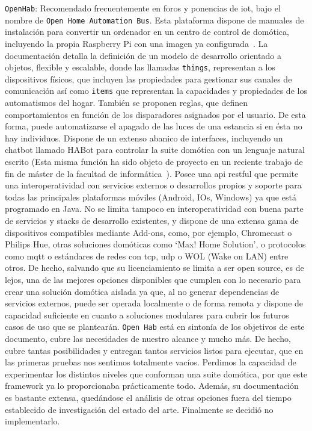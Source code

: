 \vspace{1cm}

\verb|OpenHab|: Recomendado frecuentemente en foros y ponencias de \gls{iot}, bajo el nombre de \verb|Open Home Automation Bus|. Esta plataforma dispone de manuales de instalación para convertir un ordenador en un centro de control de domótica, incluyendo la propia Raspberry Pi con una imagen ya configurada~\cite{openHabRaspberryPi}. La documentación detalla la definición de un modelo de desarrollo orientado a objetos, flexible y escalable, donde las llamadas \verb|things|, representan a los dispositivos físicos, que incluyen las propiedades para gestionar sus canales de comunicación así como \verb|items| que representan la capacidades y propiedades de los automatismos del hogar. También se proponen reglas, que definen comportamientos en función de los disparadores asignados por el usuario. De esta forma, puede automatizarse el apagado de las luces de una estancia si en ésta no hay individuos. Dispone de un extenso abanico de interfaces, incluyendo un chatbot llamado HABot para controlar la suite domótica con un lenguaje natural escrito (Esta misma función ha sido objeto de proyecto en un reciente trabajo de fin de máster de la facultad de informática~\cite{brun2018smart}). Posee una \gls{api} restful que permite una interoperatividad con servicios externos o desarrollos propios y soporte para todas las principales plataformas móviles (Android, IOs, Windows) ya que está programado en Java. No se limita tampoco en interoperatividad con buena parte de servicios y stacks de desarrollo existentes, y dispone de una extensa gama de dispositivos compatibles mediante Add-ons, como, por ejemplo, Chromecast o Philips Hue, otras soluciones domóticas como ‘Max! Home Solution’, o protocolos como \gls{mqtt} o estándares de redes con \gls{tcp}, \gls{udp} o WOL (Wake on LAN) entre otros. De hecho, salvando que su licenciamiento se limita a ser open source, es de lejos, una de las mejores opciones disponibles que cumplen con lo necesario para crear una solución domótica aislada ya que, al no generar dependencias de servicios externos, puede ser operada localmente o de forma remota y dispone de capacidad suficiente en cuanto a soluciones modulares para cubrir los futuros casos de uso que se plantearán. \verb|Open Hab| está en sintonía de los objetivos de este documento, cubre las necesidades de nuestro alcance y mucho más. De hecho, cubre tantas posibilidades y entregan tantos servicios listos para ejecutar, que en las primeras pruebas nos sentimos totalmente vacíos. Perdimos la capacidad de experimentar los distintos niveles que conforman una suite domótica, por que este \gls{framework} ya lo proporcionaba prácticamente todo. Además, su documentación es bastante extensa, quedándose el análisis de otras opciones fuera del tiempo establecido de investigación del estado del arte. Finalmente se decidió no implementarlo.

